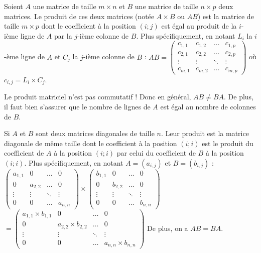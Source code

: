 	\begin{formula}
		Soient $A$ une matrice de taille $m \times n$ et $B$ une matrice de taille $n \times p$ deux matrices. Le produit de ces deux matrices (notée $A \times B$ ou $AB$) est la matrice de taille $m \times p$ dont le coefficient à la position $(i; j)$ est égal au produit de la $i$-ième ligne de $A$ par la $j$-ième colonne de $B$. Plus spécifiquement, en notant $L_i$ la $i$-ème ligne de $A$ et $C_j$ la $j$-ième colonne de $B$ :
		\newpar
		$\displaystyle{AB = \begin{pmatrix}c_{1,1} & c_{1,2} & \dots & c_{1,p} \\ c_{2,1} & c_{2,2} & \dots & c_{2,p} \\ \vdots & \vdots & \ddots & \vdots \\ c_{m,1} & c_{m,2} & \dots & c_{m,p}\end{pmatrix}}$ où $c_{i,j} = L_i \times C_j$.
	\end{formula}
	
	\begin{tip}[Attention !]
		Le produit matriciel n'est pas commutatif ! Donc en général, $AB \neq BA$.
		\newpar
		De plus, il faut bien s'assurer que le nombre de lignes de $A$ est égal au nombre de colonnes de $B$.
	\end{tip}
	
	\begin{tip}
		Si $A$ et $B$ sont deux matrices diagonales de taille $n$. Leur produit est la matrice diagonale de même taille dont le coefficient à la position $(i; i)$ est le produit du coefficient de $A$ à la position $(i;i)$ par celui du coefficient de $B$ à la position $(i;i)$. Plus spécifiquement, en notant $A = (a_{i,j})$ et $B = (b_{i,j})$ :
		\newpar
		$\displaystyle{\begin{pmatrix}a_{1,1} & 0 & \dots & 0 \\ 0 & a_{2,2} & \dots & 0 \\ \vdots & \vdots & \ddots & \vdots \\ 0 & 0 & \dots & a_{n,n}\end{pmatrix} \times \begin{pmatrix}b_{1,1} & 0 & \dots & 0 \\ 0 & b_{2,2} & \dots & 0 \\ \vdots & \vdots & \ddots & \vdots \\ 0 & 0 & \dots & b_{n,n}\end{pmatrix}}$
		\newpar
		$\displaystyle{= \begin{pmatrix}a_{1,1} \times b_{1,1} & 0 & \dots & 0 \\ 0 & a_{2,2} \times b_{2,2} & \dots & 0 \\ \vdots & \vdots & \ddots & \vdots \\ 0 & 0 & \dots & a_{n,n} \times b_{n,n}\end{pmatrix}}$
		\newpar
		De plus, on a $AB = BA$.
	\end{tip}
	
